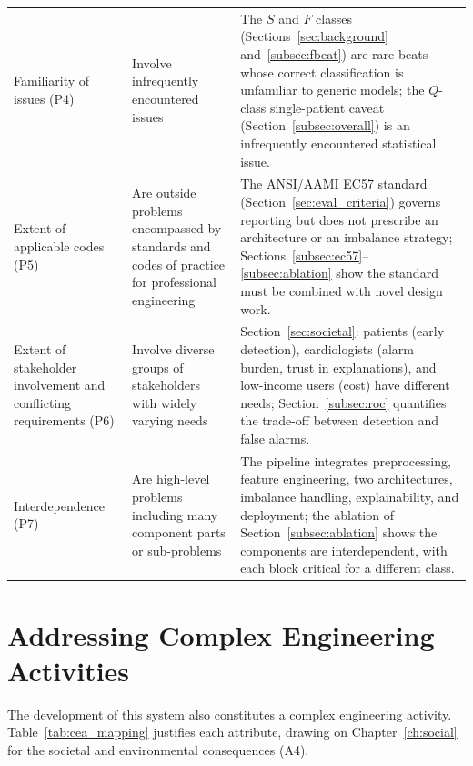 \begin{longtable}{@{}>{\raggedright\arraybackslash}p{1.4in}>{\raggedright\arraybackslash}p{2.4in}>{\raggedright\arraybackslash}p{1.4in}@{}}
Familiarity of issues (P4) & Involve infrequently encountered issues
& The $S$ and $F$ classes (Sections~\ref{sec:background}
and~\ref{subsec:fbeat}) are rare beats whose
correct classification is unfamiliar to generic models; the $Q$-class
single-patient caveat (Section~\ref{subsec:overall}) is an infrequently
encountered statistical issue. \\
\addlinespace

Extent of applicable codes (P5) & Are outside problems encompassed by
standards and codes of practice for professional engineering
& The ANSI/AAMI EC57 standard (Section~\ref{sec:eval_criteria}) governs
reporting but does not
prescribe an architecture or an imbalance strategy;
Sections~\ref{subsec:ec57}--\ref{subsec:ablation}
show the standard must be combined with novel design work. \\
\addlinespace

Extent of stakeholder involvement and conflicting requirements (P6) &
Involve diverse groups of stakeholders with widely varying needs
& Section~\ref{sec:societal}: patients (early detection), cardiologists
(alarm burden,
trust in explanations), and low-income users (cost) have different needs;
Section~\ref{subsec:roc} quantifies the trade-off between detection and
false alarms. \\
\addlinespace

Interdependence (P7) & Are high-level problems including many component
parts or sub-problems
& The pipeline integrates preprocessing, feature engineering, two
architectures, imbalance handling, explainability, and deployment; the
ablation of Section~\ref{subsec:ablation} shows the components are
interdependent, with
each block critical for a different class. \\

\end{longtable}


\section{Addressing Complex Engineering Activities}
\label{sec:cea}

The development of this system also constitutes a complex engineering
activity. Table~\ref{tab:cea_mapping} justifies each attribute, drawing on
Chapter~\ref{ch:social} for the societal and environmental consequences
(A4).

